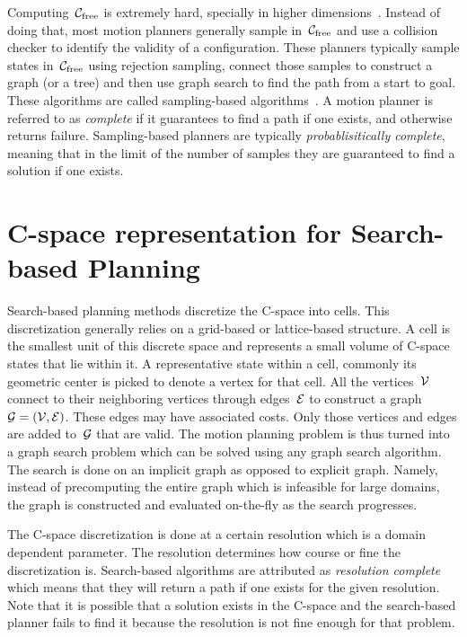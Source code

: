 \documentclass[a4paper]{report}
\begin{document}
Computing~$\mathcal{C}_{\rm free}$ is extremely hard, specially in higher dimensions~\cite{halperin2017algorithmic}. Instead of doing that, most motion planners generally sample in~$\mathcal{C}_{\rm free}$ and use a collision checker to identify the validity of a configuration. These planners typically sample states in~$\mathcal{C}_{\rm free}$ using rejection sampling, connect those samples to construct a graph (or a tree) and then use graph search to find the path from a start to goal. These algorithms are called sampling-based algorithms~\cite{salzman2019sampling}. A motion planner is referred to as \emph{complete} if it guarantees to find a path if one exists, and otherwise returns failure. Sampling-based planners are typically \emph{probablisitically complete}, meaning that in the limit of the number of samples they are guaranteed to find a solution if one exists.

\section{C-space representation for Search-based Planning}
\label{sec:sbp}
Search-based planning methods discretize the C-space into cells. This discretization generally relies on a grid-based or lattice-based structure. A cell is the smallest unit of this discrete space and represents a small volume of C-space states that lie within it. A representative state within a cell, commonly its geometric center is picked to denote a vertex for that cell. All the vertices~$\mathcal{V}$ connect to their neighboring vertices through edges~$\mathcal{E}$ to construct a graph~$\mathcal{G} = (\mathcal{V}, \mathcal{E})$. These edges may have associated costs. Only those vertices and edges are added to~$\mathcal{G}$ that are valid. The motion planning problem is thus turned into a graph search problem which can be solved using any graph search algorithm. The search is done on an implicit graph as opposed to explicit graph. Namely, instead of precomputing the entire graph which is infeasible for large domains, the graph is constructed and evaluated on-the-fly as the search progresses.

The C-space discretization is done at a certain resolution which is a domain dependent parameter. The resolution determines how course or fine the discretization is. Search-based algorithms are attributed as \emph{resolution complete} which means that they will return a path if one exists for the given resolution. Note that it is possible that a solution exists in the C-space and the search-based planner fails to find it because the resolution is not fine enough for that problem.
\end{document}
